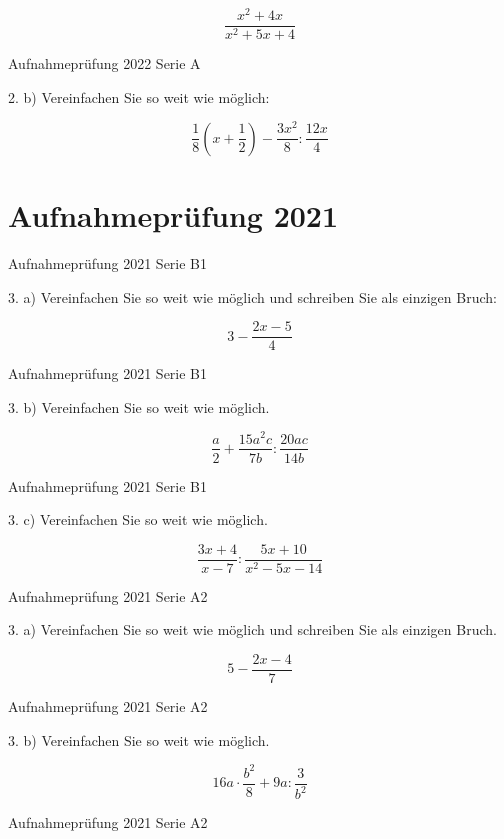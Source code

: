 {$$\frac{x^2+4x}{x^2+5x+4}$$

Aufnahmeprüfung 2022 Serie A

2. b) Vereinfachen Sie so weit wie möglich:

$$\frac18\left(x+\frac12\right)  - \frac{3x^2}{8} : \frac{12x}{4}$$

\section*{Aufnahmeprüfung 2021}
Aufnahmeprüfung 2021 Serie B1

3. a) Vereinfachen Sie so weit wie möglich und schreiben Sie als
einzigen Bruch:

$$3-\frac{2x-5}{4}$$

Aufnahmeprüfung 2021 Serie B1

3. b) Vereinfachen Sie so weit wie möglich.

$$\frac{a}2 + \frac{15a^2c}{7b} : \frac{20ac}{14b}$$

Aufnahmeprüfung 2021 Serie B1

3. c) Vereinfachen Sie so weit wie möglich.

$$\frac{3x+4}{x-7} : \frac{5x+10}{x^2-5x-14}$$

Aufnahmeprüfung 2021 Serie A2

3. a) Vereinfachen Sie so weit wie möglich und schreiben Sie als
einzigen Bruch.

$$5-\frac{2x-4}{7}$$

Aufnahmeprüfung 2021 Serie A2

3. b) Vereinfachen Sie so weit wie möglich.

$$16a\cdot{}\frac{b^2}{8} + 9a : \frac{3}{b^2}$$

Aufnahmeprüfung 2021 Serie A2

}

